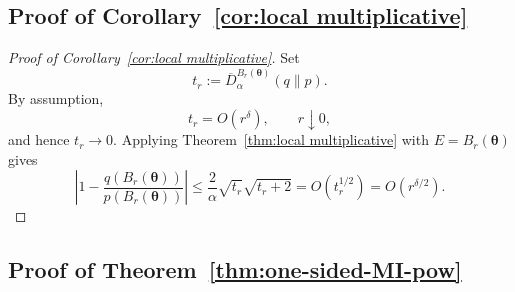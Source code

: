 \documentclass[11pt,a4paper]{article}
\newcommand{\pa}{\boldsymbol\theta}
\theoremstyle{compactplain}
\theoremstyle{compactdefinition}
\numberwithin{equation}{section}
\begin{document}
\subsection*{Proof of Corollary~\ref{cor:local multiplicative}}
\begin{proof}[Proof of Corollary~\ref{cor:local multiplicative}]
Set
\[
 t_r:=\overline D_\alpha^{B_r(\pa)}(q\|p).
\]
By assumption,
\[
 t_r=O(r^\delta),
 \qquad r\downarrow0,
\]
and hence \(t_r\to0\). Applying Theorem~\ref{thm:local multiplicative} with \(E=B_r(\pa)\) gives
\[
 \left|1-\frac{q(B_r(\pa))}{p(B_r(\pa))}\right|
 \le
 \frac2\alpha\sqrt{t_r}\sqrt{t_r+2}
 =O(t_r^{1/2})
 =O(r^{\delta/2}).
\]
\end{proof}

\subsection*{Proof of Theorem~\ref{thm:one-sided-MI-pow}}
\end{document}
